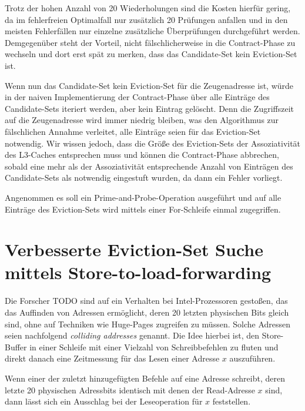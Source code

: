 Trotz der hohen Anzahl von 20 Wiederholungen sind die Kosten hierfür gering, da im fehlerfreien Optimalfall nur zusätzlich 20 Prüfungen anfallen und in den meisten Fehlerfällen nur einzelne zusätzliche Überprüfungen durchgeführt werden. 
Demgegenüber steht der Vorteil, nicht fälschlicherweise in die Contract-Phase zu wechseln und dort erst spät zu merken, dass das Candidate-Set kein Eviction-Set ist.

Wenn nun das Candidate-Set kein Eviction-Set für die Zeugenadresse ist, würde in der naiven Implementierung der Contract-Phase über alle Einträge des Candidate-Sets iteriert werden, aber kein Eintrag gelöscht.
Denn die Zugriffszeit auf die Zeugenadresse wird immer niedrig bleiben, was den Algorithmus zur fälschlichen Annahme verleitet, alle Einträge seien für das Eviction-Set notwendig.
Wir wissen jedoch, dass die Größe des Eviction-Sets der Assoziativität des L3-Caches entsprechen muss und können die Contract-Phase abbrechen, sobald eine mehr als der Assoziativität entsprechende Anzahl von Einträgen des Candidate-Sets als notwendig eingestuft wurden, da dann ein Fehler vorliegt.

Angenommen es soll ein Prime-and-Probe-Operation ausgeführt und auf alle Einträge des Eviction-Sets wird mittels einer For-Schleife einmal zugegriffen.

\section{Verbesserte Eviction-Set Suche mittels Store-to-load-forwarding}

Die Forscher TODO sind auf ein Verhalten bei Intel-Prozessoren gestoßen, das das Auffinden von Adressen ermöglicht, deren 20 letzten physischen Bits gleich sind, ohne auf Techniken wie Huge-Pages zugreifen zu müssen.
Solche Adressen seien nachfolgend \textit{colliding addresses} genannt.
Die Idee hierbei ist, den Store-Buffer in einer Schleife mit einer Vielzahl von Schreibbefehlen zu fluten und direkt danach eine Zeitmessung für das Lesen einer Adresse $x$ auszuführen.

Wenn einer der zuletzt hinzugefügten Befehle auf eine Adresse schreibt, deren letzte 20 physischen Adressbits identisch mit denen der Read-Adresse $x$ sind, dann lässt sich ein Ausschlag bei der Leseoperation für $x$ feststellen.

